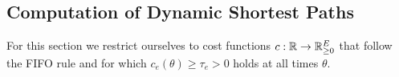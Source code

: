 \subsection{Computation of Dynamic Shortest Paths}

For this section we restrict ourselves to cost functions $c:\mathbb{R}\rightarrow\mathbb{R}_{\geq0}^E$ that follow the FIFO rule and for which $c_e(\theta) \geq \tau_e > 0$ holds at all times $\theta$.


